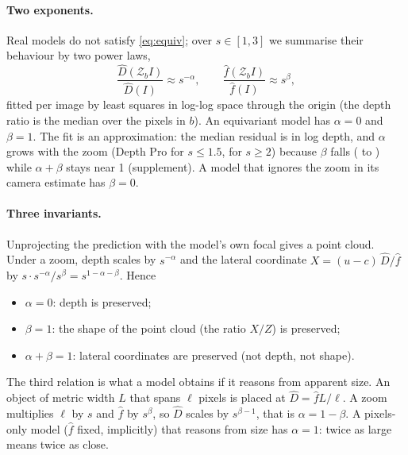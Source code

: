 \paragraph{Two exponents.}
Real models do not satisfy \cref{eq:equiv}; over $s\in[1,3]$ we summarise their behaviour by two power laws,
\begin{equation}
  \frac{\hat D(\mathcal{Z}_b I)}{\hat D(I)} \approx s^{-\alpha}, \qquad
  \frac{\hat f(\mathcal{Z}_b I)}{\hat f(I)} \approx s^{\beta},
  \label{eq:exponents}
\end{equation}
fitted per image by least squares in log-log space through the origin
(the depth ratio is the median over the pixels in $b$).
An equivariant model has $\alpha=0$ and $\beta=1$. The fit is an approximation: the median residual is
\fitRmsMedian{} in log depth, and $\alpha$ grows with the zoom (Depth Pro \DepthproAlphaSmall{} for $s\le1.5$,
\DepthproAlphaLarge{} for $s\ge2$) because $\beta$ falls (\DepthproUncBetaSmall{} to \DepthproUncBetaLarge) while
$\alpha+\beta$ stays near 1 (supplement).
A model that ignores the zoom in its camera estimate has $\beta=0$.

\paragraph{Three invariants.}
Unprojecting the prediction with the model's own focal gives a point cloud.
Under a zoom, depth scales by $s^{-\alpha}$ and the lateral coordinate
$X=(u-c)\,\hat D/\hat f$ by $s\cdot s^{-\alpha}/s^{\beta}=s^{1-\alpha-\beta}$. Hence
\begin{itemize}
  \item $\alpha=0$: depth is preserved;
  \item $\beta=1$: the shape of the point cloud (the ratio $X/Z$) is preserved;
  \item $\alpha+\beta=1$: lateral coordinates are preserved (not depth, not shape).
\end{itemize}
The third relation is what a model obtains if it reasons from apparent size.
An object of metric width $L$ that spans $\ell$ pixels is placed at
$\hat D=\hat f L/\ell$. A zoom multiplies $\ell$ by $s$ and $\hat f$ by $s^{\beta}$, so
$\hat D$ scales by $s^{\beta-1}$, that is $\alpha=1-\beta$.
A pixels-only model ($\hat f$ fixed, implicitly) that reasons from size has $\alpha=1$:
twice as large means twice as close.

